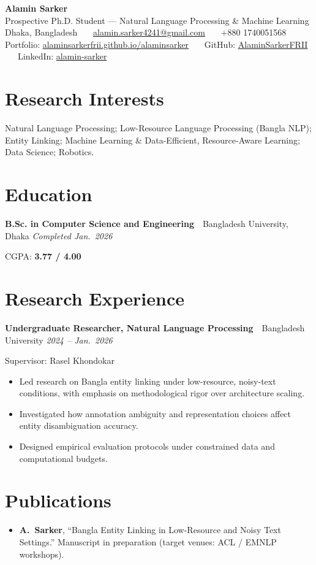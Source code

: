 \documentclass[10pt,a4paper]{article}
\newcommand{\entry}[3]{\textbf{#1}\ \textbar\ #2 \hfill \textit{#3}\par}
\newcommand{\link}[2]{\href{#1}{\color{accent}#2}}
\begin{document}
\begin{center}
  {\LARGE\bfseries\color{accent} Alamin Sarker}\\[3pt]
  Prospective Ph.D. Student --- Natural Language Processing \& Machine Learning\\[3pt]
  Dhaka, Bangladesh \ \textbullet\ \
  \link{mailto:alamin.sarker4241@gmail.com}{alamin.sarker4241@gmail.com} \ \textbullet\ \
  +880 1740051568\\[2pt]
  Portfolio: \link{https://alaminsarkerfrii.github.io/alaminsarker/}{alaminsarkerfrii.github.io/alaminsarker} \ \textbullet\ \
  GitHub: \link{https://github.com/AlaminSarkerFRII}{AlaminSarkerFRII} \ \textbullet\ \
  LinkedIn: \link{https://www.linkedin.com/in/alamin-sarker-b2676522a/}{alamin-sarker}
\end{center}

\section{Research Interests}
Natural Language Processing; Low-Resource Language Processing (Bangla NLP); Entity Linking;
Machine Learning \& Data-Efficient, Resource-Aware Learning; Data Science; Robotics.

\section{Education}
\entry{B.Sc. in Computer Science and Engineering}{Bangladesh University, Dhaka}{Completed Jan.\ 2026}
CGPA: \textbf{3.77 / 4.00}

\section{Research Experience}
\entry{Undergraduate Researcher, Natural Language Processing}{Bangladesh University}{2024 -- Jan.\ 2026}
Supervisor: Rasel Khondokar
\begin{itemize}
  \item Led research on Bangla entity linking under low-resource, noisy-text conditions, with emphasis on methodological rigor over architecture scaling.
  \item Investigated how annotation ambiguity and representation choices affect entity disambiguation accuracy.
  \item Designed empirical evaluation protocols under constrained data and computational budgets.
\end{itemize}

\section{Publications}
\begin{itemize}
  \item \textbf{A.\ Sarker}, ``Bangla Entity Linking in Low-Resource and Noisy Text Settings.'' Manuscript in preparation (target venues: ACL / EMNLP workshops).
\end{itemize}
\end{document}
